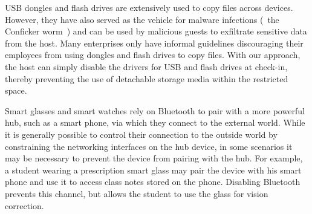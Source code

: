  USB dongles and flash drives are extensively
used to copy files across devices. However, they have also served as the
vehicle for malware infections (\eg~the Conficker worm~\cite{conficker:tifs12})
and can be used by malicious guests to exfiltrate sensitive data from the host.
Many enterprises only have informal guidelines discouraging their employees
from using dongles and flash drives to copy files. With our approach, the host
can simply disable the drivers for USB and flash drives at check-in, thereby
preventing the use of detachable storage media within the restricted space.

 Smart glasses and smart watches rely on Bluetooth to
pair with a more powerful hub, such as a smart phone, via which they connect to
the external world. While it is generally possible to control their connection
to the outside world by constraining the networking interfaces on the hub
device, in some scenarios it may be necessary to prevent the device from
pairing with the hub. For example, a student wearing a prescription smart glass
may pair the device with his smart phone and use it to access class notes
stored on the phone. Disabling Bluetooth prevents this channel, but allows the
student to use the glass for vision correction.


